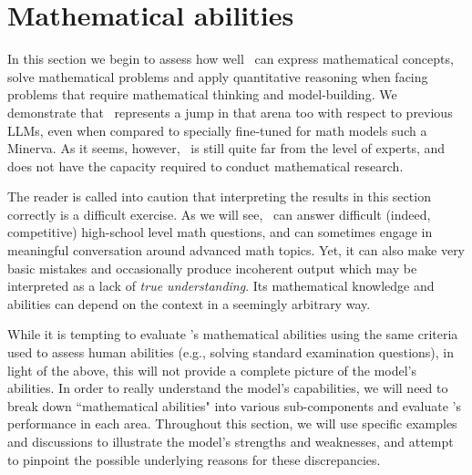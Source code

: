 
\section{Mathematical abilities}
\label{sec:math}

In this section we begin to assess how well \DV \ can express mathematical concepts, solve mathematical problems and apply quantitative reasoning when facing problems that require mathematical thinking and model-building. We demonstrate that \DV \ represents a jump in that arena too with respect to previous LLMs, even when compared to specially fine-tuned for math models such a Minerva. As it seems, however, \DV \ is still quite far from the level of experts, and does not have the capacity required to conduct mathematical research. 

The reader is called into caution that interpreting the results in this section correctly is a difficult exercise. As we will see, \DV\ can answer difficult (indeed, competitive) high-school level math questions, and can sometimes engage in meaningful conversation around advanced math topics. Yet, it can also make very basic mistakes and occasionally produce incoherent output which may be interpreted as a lack of {\em true understanding}. Its mathematical knowledge and abilities can depend on the context in a seemingly arbitrary way. 

While it is tempting to evaluate \DV's mathematical abilities using the same criteria used to assess human abilities (e.g., solving standard examination questions), in light of the above, this will not provide a complete picture of the model's abilities. In order to really understand the model's capabilities, we will need to break down ``mathematical abilities" into various sub-components and evaluate \DV's performance in each area. Throughout this section, we will use specific examples and discussions to illustrate the model's strengths and weaknesses, and attempt to pinpoint the possible underlying reasons for these discrepancies. 

